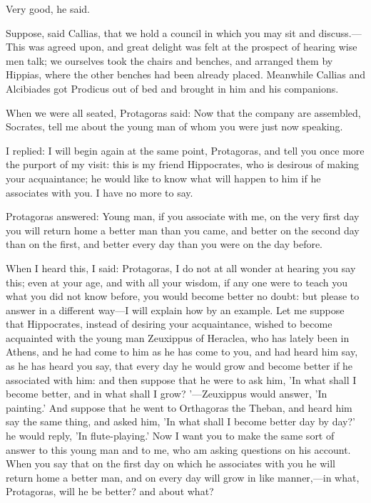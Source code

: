 \documentclass[11pt,letter]{article}
\begin{document}
\par  Very good, he said.

\par  Suppose, said Callias, that we hold a council in which you may sit and discuss.—This was agreed upon, and great delight was felt at the prospect of hearing wise men talk; we ourselves took the chairs and benches, and arranged them by Hippias, where the other benches had been already placed. Meanwhile Callias and Alcibiades got Prodicus out of bed and brought in him and his companions.

\par  When we were all seated, Protagoras said: Now that the company are assembled, Socrates, tell me about the young man of whom you were just now speaking.

\par  I replied: I will begin again at the same point, Protagoras, and tell you once more the purport of my visit: this is my friend Hippocrates, who is desirous of making your acquaintance; he would like to know what will happen to him if he associates with you. I have no more to say.

\par  Protagoras answered: Young man, if you associate with me, on the very first day you will return home a better man than you came, and better on the second day than on the first, and better every day than you were on the day before.

\par  When I heard this, I said: Protagoras, I do not at all wonder at hearing you say this; even at your age, and with all your wisdom, if any one were to teach you what you did not know before, you would become better no doubt: but please to answer in a different way—I will explain how by an example. Let me suppose that Hippocrates, instead of desiring your acquaintance, wished to become acquainted with the young man Zeuxippus of Heraclea, who has lately been in Athens, and he had come to him as he has come to you, and had heard him say, as he has heard you say, that every day he would grow and become better if he associated with him: and then suppose that he were to ask him, 'In what shall I become better, and in what shall I grow? '—Zeuxippus would answer, 'In painting.' And suppose that he went to Orthagoras the Theban, and heard him say the same thing, and asked him, 'In what shall I become better day by day?' he would reply, 'In flute-playing.' Now I want you to make the same sort of answer to this young man and to me, who am asking questions on his account. When you say that on the first day on which he associates with you he will return home a better man, and on every day will grow in like manner,—in what, Protagoras, will he be better? and about what?
\end{document}
